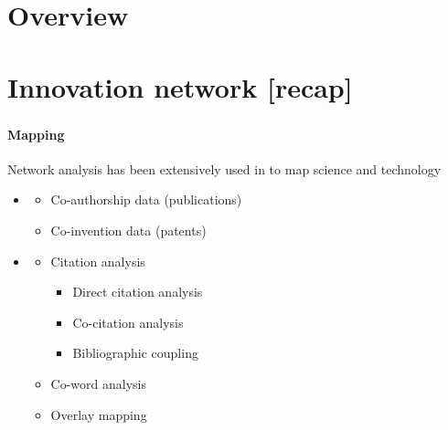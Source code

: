 \documentclass[8pt]{beamer}
\begin{document}
\section*{Overview}

\begin{frame}
\frametitle{\insertsection}
\tableofcontents[hideallsubsections]
\end{frame}





\section{Innovation network [recap]}

\bgroup
{}
\begin{frame}[plain]{}
\begin{center}
\color{white}{\Huge\insertsection}
\end{center}
\end{frame}
\egroup


\begin{frame}
\frametitle{\insertsection}
\framesubtitle{Mapping}


Network analysis has been extensively used in {\color{blue}{bibliometrics/scientometrics}} to map science and technology
		
\medskip

\begin{itemize}
\item  {\color{blue}{Mapping of collaboration}}
		\begin{itemize}
		\item Co-authorship data (publications)
		\item Co-invention data (patents)
		\end{itemize}
		
\medskip

\item  {\color{blue}{Mapping of cognitive connections}}
 	    \begin{itemize}
		\item Citation analysis
    			\begin{itemize}
    			\item Direct citation analysis 
    			\item Co-citation analysis 
    			\item Bibliographic coupling 
    			\end{itemize}
		\item Co-word analysis
		\item Overlay mapping 
		\end{itemize}
		
\end{itemize}

\end{frame}
\end{document}

